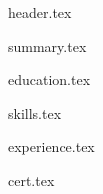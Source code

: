 \documentclass[11pt, a4paper]{extarticle}
\begin{document}
	{header.tex}

	{summary.tex}

	{education.tex}

	{skills.tex}

	{experience.tex}

	{cert.tex}
\end{document}

